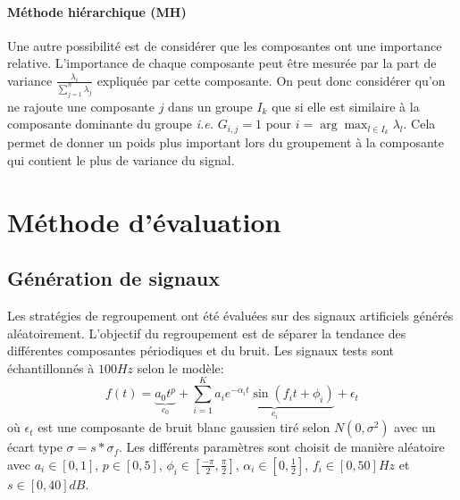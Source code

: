 \documentclass{gretsi}
\newcommand{\set}[1]{\left \{ 1, \dots, #1 \right \}}
\newcommand{\inter}{\left[0, 1\right]}
\begin{document}
\paragraph{Méthode hiérarchique (MH)}
Une autre possibilité est de considérer que les composantes ont une importance relative. L'importance de chaque composante peut être mesurée par la part de variance $\frac{\lambda_i}{\sum_{j=1}^n \lambda_j}$ expliquée par cette composante. On peut donc considérer qu'on ne rajoute une composante $j$ dans un groupe $I_k$ que si elle est similaire à la composante dominante du groupe \emph{ i.e. } $G_{i, j} = 1$ pour $i = \arg\max_{l \in I_k} \lambda_l$. Cela permet de donner un poids plus important lors du groupement à la composante qui contient le plus de variance du signal.



\section{Méthode d'évaluation}
\label{sec:eval}

\subsection{Génération de signaux}
\label{sub:artsig}

    Les stratégies de regroupement ont été évaluées sur des signaux artificiels générés aléatoirement. L'objectif du regroupement est de séparer la tendance des différentes composantes périodiques et du bruit. Les signaux tests sont échantillonnés à $100Hz$ selon le modèle:
    \begin{equation}\label{eq:artsig}
    f(t) = \underbrace{a_0 t^p}_{c_0} + \sum_{i=1}^K \underbrace{a_i e^{-\alpha_i t} \sin\left(f_i t + \phi_i\right)}_{c_i} + \epsilon_t
    \end{equation}où $\epsilon_t$  est une composante de bruit blanc gaussien tiré selon $N(0, \sigma^2)$ avec un écart type $\sigma = s*\sigma_f$. Les différents paramètres sont choisit de manière aléatoire avec $a_i \in \inter$, $p \in \left[0, 5\right]$, $\displaystyle \phi_i \in\left[\frac{-\pi}{2}, \frac{\pi}{2}\right]$, $\alpha_i \in \left[0, \frac{1}{2}\right]$, $f_i \in \left[0, 50\right]Hz$ et $s \in \left[0, 40\right]dB$.
    
\end{document}
